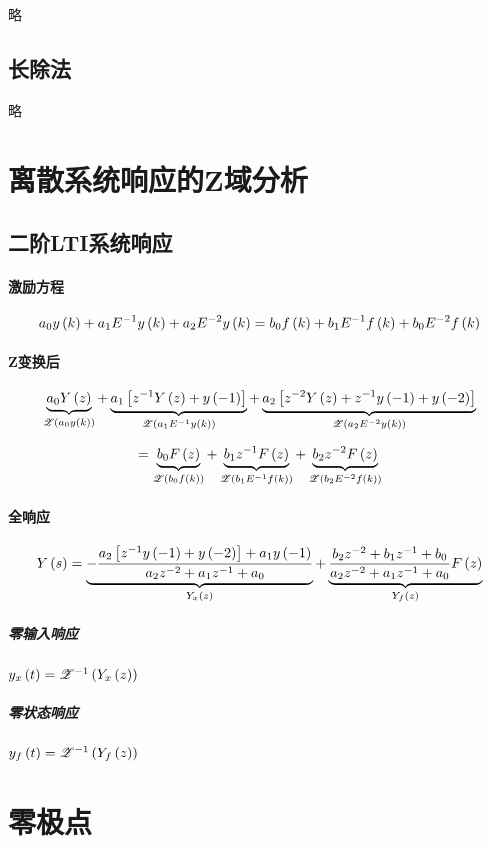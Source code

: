 \documentclass{article}
\begin{document}
略

\subsection{长除法}

略

\section{离散系统响应的Z域分析}

\subsection{二阶LTI系统响应}

\paragraph{激励方程}

\[a_0y\left(k\right)+a_1E^{-1}y\left(k\right)+a_2E^{-2}y\left(k\right)
    =b_0f\left(k\right)+b_1E^{-1}f\left(k\right)+b_0E^{-2}f\left(k\right)\]

\paragraph{Z变换后}

\[\underbrace{a_0Y\left(z\right)}_{\mathscr Z\left(a_0y\left(k\right)\right)}
    +\underbrace{a_1\left[{z^{-1}Y\left(z\right)+y\left(-1\right)}\right]}_{\mathscr Z\left(a_1E^{-1}y\left(k\right)\right)}
    +\underbrace{a_2\left[{z^{-2}Y\left(z\right)+z^{-1}y\left(-1\right)+y\left(-2\right)}\right]}_{\mathscr Z\left(a_2E^{-2}y\left(k\right)\right)}\]

\[=\underbrace{b_0F\left(z\right)}_{\mathscr Z\left(b_0f\left(k\right)\right)}
    +\underbrace{b_1z^{-1}F\left(z\right)}_{\mathscr Z\left(b_1E^{-1}f\left(k\right)\right)}
    +\underbrace{b_2z^{-2}F\left(z\right)}_{\mathscr Z\left(b_2E^{-2}f\left(k\right)\right)}\]

\paragraph{全响应}

\[Y\left(s\right)
    =\underbrace{-\frac{a_2\left[z^{-1}y\left(-1\right)+y\left(-2\right)\right]+a_1y\left(-1\right)}{a_2z^{-2}+a_1z^{-1}+a_0}}_{Y_x\left(z\right)}
    +\underbrace{\frac{b_2z^{-2}+b_1z^{-1}+b_0}{a_2z^{-2}+a_1z^{-1}+a_0}F\left(z\right)}_{Y_f\left(z\right)}\]

\subparagraph{零输入响应}

$y_x\left(t\right)=\mathscr Z^{-1}\left(Y_x\left(z\right)\right)$

\subparagraph{零状态响应}

$y_f\left(t\right)=\mathscr Z^{-1}\left(Y_f\left(z\right)\right)$

\section{零极点}
\end{document}
